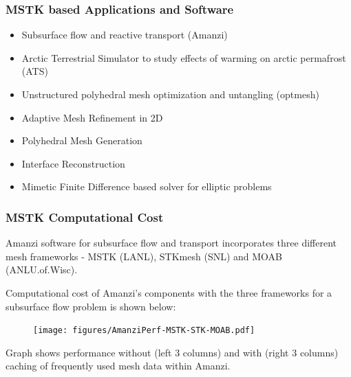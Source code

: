 \documentclass{beamer}
\begin{document}
\begin{frame}
\frametitle{MSTK based Applications and Software}

\begin{itemize}
  \item Subsurface flow and reactive transport (Amanzi)
  \item Arctic Terrestrial Simulator to study effects of warming on
  arctic permafrost (ATS)
  \item Unstructured polyhedral mesh optimization and untangling (optmesh)
  \item Adaptive Mesh Refinement in 2D
  \item Polyhedral Mesh Generation
  \item Interface Reconstruction
  \item Mimetic Finite Difference based solver for elliptic problems
\end{itemize}

\end{frame}

\begin{frame}
\frametitle{MSTK Computational Cost}

Amanzi software for subsurface flow and transport incorporates three
different mesh frameworks - MSTK (LANL), STKmesh (SNL) and MOAB
(ANL\/U.of.Wisc).

Computational cost of Amanzi's components with the three frameworks
for a subsurface flow problem is shown below:

\begin{figure}
\begin{center}
\texttt{[image: figures/AmanziPerf-MSTK-STK-MOAB.pdf]}
\end{center}
\end{figure}

Graph shows performance without (left 3 columns) and with (right 3
columns) caching of frequently used mesh data within Amanzi.

\end{frame}
\end{document}
